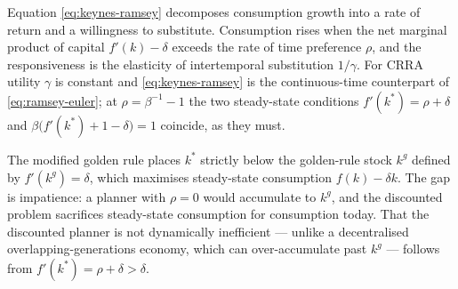 \begin{remark}\label{rem:keynes-ramsey}
	Equation \eqref{eq:keynes-ramsey} decomposes consumption growth into a rate
	of return and a willingness to substitute. Consumption rises when the net
	marginal product of capital $f'(k)-\delta$ exceeds the rate of time preference
	$\rho$, and the responsiveness is the elasticity of intertemporal substitution
	$1/\gamma$. For CRRA utility $\gamma$ is constant and \eqref{eq:keynes-ramsey}
	is the continuous-time counterpart of \eqref{eq:ramsey-euler}; at
	$\rho=\beta^{-1}-1$ the two steady-state conditions
	$f'(k^{\ast})=\rho+\delta$ and $\beta\bigl(f'(k^{\ast})+1-\delta\bigr)=1$
	coincide, as they must.

	The modified golden rule places $k^{\ast}$ strictly below the golden-rule stock
	$k^{g}$ defined by $f'(k^{g})=\delta$, which maximises steady-state consumption
	$f(k)-\delta k$. The gap is impatience: a planner with $\rho=0$ would accumulate
	to $k^{g}$, and the discounted problem sacrifices steady-state consumption for
	consumption today. That the discounted planner is not dynamically inefficient
	--- unlike a decentralised overlapping-generations economy, which can
	over-accumulate past $k^{g}$ --- follows from $f'(k^{\ast})=\rho+\delta>\delta$.
\end{remark}

